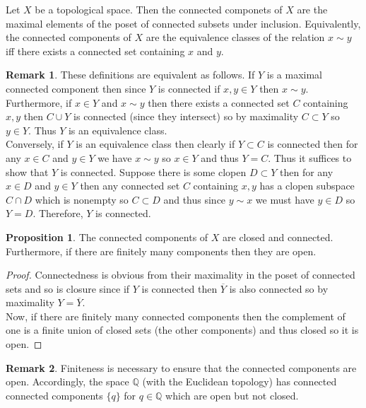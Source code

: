 \documentclass[12pt]{extarticle}
\theoremstyle{definition}
\newtheorem{proposition}[theorem]{Proposition}
\newtheorem{remark}{Remark}
\newenvironment{definition}[1][Definition:]{\begin{trivlist}
\item[\hskip \labelsep {\bfseries #1}]}{\end{trivlist}}
\begin{document}
\begin{definition}
Let $X$ be a topological space. Then the connected componets of $X$ are the maximal elements of the poset of connected subsets under inclusion. Equivalently, the connected components of $X$ are the equivalence classes of the relation $x \sim y$ iff there exists a connected set containing $x$ and $y$.
\end{definition}

\begin{remark}
These definitions are equivalent as follows. If $Y$ is a maximal connected component then since $Y$ is connected if $x, y \in Y$ then $x \sim y$. Furthermore, if $x \in Y$ and $x \sim y$ then there exists a connected set $C$ containing $x,y$ then $C \cup Y$ is connected (since they intersect) so by maximality $C \subset Y$ so $y \in Y$. Thus $Y$ is an equivalence class. 
\bigskip\\
Conversely, if $Y$ is an equivalence class then clearly if $Y \subset C$ is connected then for any $x \in C$ and $y \in Y$ we have $x \sim y$ so $x \in Y$ and thus $Y = C$. Thus it suffices to show that $Y$ is connected. Suppose there is some clopen $D \subset Y$ then for any $x \in D$ and $y \in Y$ then any connected set $C$ containing $x, y$ has a clopen subspace $C \cap D$ which is nonempty so $C \subset D$ and thus since $y \sim x$ we must have $y \in D$ so $Y = D$. Therefore, $Y$ is connected.
\end{remark}

\begin{proposition}
The connected components of $X$ are closed and connected. Furthermore, if there are finitely many components then they are open.
\end{proposition}

\begin{proof}
Connectedness is obvious from their maximality in the poset of connected sets and so is closure since if $Y$ is connected then $\overline{Y}$ is also connected so by maximality $Y = \overline{Y}$. 
\bigskip\\
Now, if there are finitely many connected components then the complement of one is a finite union of closed sets (the other components) and thus closed so it is open.
\end{proof}

\newcommand{\Q}{\mathbb{Q}}

\begin{remark}
Finiteness is necessary to ensure that the connected components are open. Accordingly, the space $\Q$ (with the Euclidean topology) has connected connected components $\{ q \}$ for $q \in \Q$ which are open but not closed. 
\end{remark}
\end{document}

